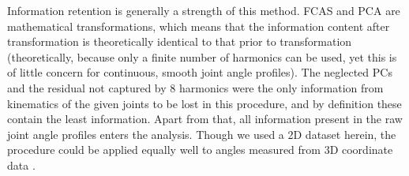 \bigskip
Information retention is generally a strength of this method.
FCAS and PCA are mathematical transformations, which means that the information content after transformation is theoretically identical to that prior to transformation (theoretically, because only a finite number of harmonics can be used, yet this is of little concern for continuous, smooth joint angle profiles).
The neglected PCs and the residual not captured by 8 harmonics were the only information from kinematics of the given joints to be lost in this procedure, and by definition these contain the least information.
Apart from that, all information present in the raw joint angle profiles enters the analysis.
Though we used a 2D dataset herein, the procedure could be applied equally well to  angles measured from 3D coordinate data \citep{Scott2022}.


